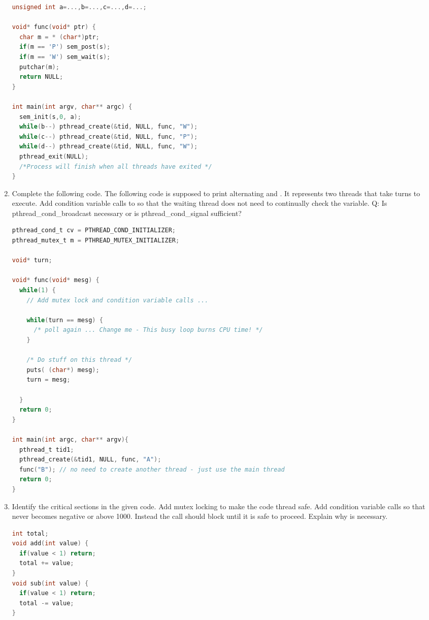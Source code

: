 \begin{enumerate}
\begin{lstlisting}[language=C]
unsigned int a=...,b=...,c=...,d=...;

void* func(void* ptr) {
  char m = * (char*)ptr;
  if(m == 'P') sem_post(s);
  if(m == 'W') sem_wait(s);
  putchar(m);
  return NULL;
}

int main(int argv, char** argc) {
  sem_init(s,0, a);
  while(b--) pthread_create(&tid, NULL, func, "W");
  while(c--) pthread_create(&tid, NULL, func, "P");
  while(d--) pthread_create(&tid, NULL, func, "W");
  pthread_exit(NULL);
  /*Process will finish when all threads have exited */
}
\end{lstlisting}

\item Complete the following code. The following code is supposed to print alternating  and . It represents two threads that take turns to execute. Add condition variable calls to  so that the waiting thread does not need to continually check the  variable. Q: Is pthread\_cond\_broadcast necessary or is pthread\_cond\_signal sufficient?

\begin{lstlisting}[language=C]
pthread_cond_t cv = PTHREAD_COND_INITIALIZER;
pthread_mutex_t m = PTHREAD_MUTEX_INITIALIZER;

void* turn;

void* func(void* mesg) {
  while(1) {
    // Add mutex lock and condition variable calls ...

    while(turn == mesg) {
      /* poll again ... Change me - This busy loop burns CPU time! */
    }

    /* Do stuff on this thread */
    puts( (char*) mesg);
    turn = mesg;

  }
  return 0;
}

int main(int argc, char** argv){
  pthread_t tid1;
  pthread_create(&tid1, NULL, func, "A");
  func("B"); // no need to create another thread - just use the main thread
  return 0;
}
\end{lstlisting}

\item Identify the critical sections in the given code. Add mutex locking to make the code thread safe. Add condition variable calls so that  never becomes negative or above 1000. Instead the call should block until it is safe to proceed. Explain why  is necessary.

\begin{lstlisting}[language=C]
int total;
void add(int value) {
  if(value < 1) return;
  total += value;
}
void sub(int value) {
  if(value < 1) return;
  total -= value;
}
\end{lstlisting}


\end{enumerate}
